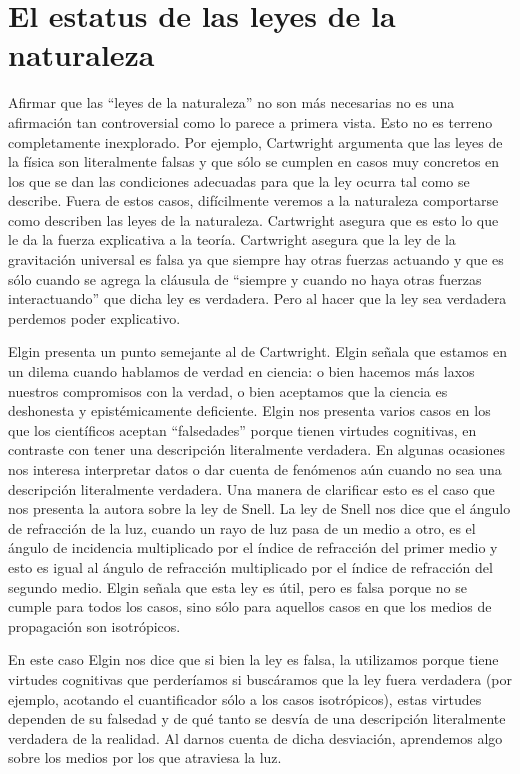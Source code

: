 \section{El estatus de las leyes de la naturaleza}

\noindent Afirmar que las ``leyes de la naturaleza'' no son más necesarias no es una afirmación tan controversial como lo parece a primera vista. Esto no es terreno completamente inexplorado. Por ejemplo, Cartwright \citeyear{Cartwright1983} argumenta que las leyes de la física son literalmente falsas y que sólo se cumplen en casos muy concretos en los que se dan las condiciones adecuadas para que la ley ocurra tal como se describe. Fuera de estos casos, difícilmente veremos a la naturaleza comportarse como describen las leyes de la naturaleza. Cartwright asegura que es esto lo que le da la fuerza explicativa a la teoría. Cartwright asegura que la ley de la gravitación universal es falsa ya que siempre hay otras fuerzas actuando y que es sólo cuando se agrega la cláusula de ``siempre y cuando no haya otras fuerzas interactuando'' que dicha ley es verdadera. Pero al hacer que la ley sea verdadera perdemos poder explicativo.

Elgin presenta un punto semejante al de Cartwright. Elgin \citeyear{Elgin2004} señala que estamos en un dilema cuando hablamos de verdad en ciencia: o bien hacemos más laxos nuestros compromisos con la verdad, o bien aceptamos que la ciencia es deshonesta y epistémicamente deficiente. Elgin nos presenta varios casos en los que los científicos aceptan ``falsedades'' porque tienen virtudes cognitivas, en contraste con tener una descripción literalmente verdadera. En algunas ocasiones nos interesa interpretar datos o dar cuenta de fenómenos aún cuando no sea una descripción literalmente verdadera. Una manera de clarificar esto es el caso que nos presenta la autora sobre la ley de Snell. La ley de Snell nos dice que el ángulo de refracción de la luz, cuando un rayo de luz pasa de un medio a otro, es el ángulo de incidencia multiplicado por el índice de refracción del primer medio y esto es igual al ángulo de refracción multiplicado por el índice de refracción del segundo medio. Elgin señala que esta ley es útil, pero es falsa porque no se cumple para todos los casos, sino sólo para aquellos casos en que los medios de propagación son isotrópicos.

En este caso Elgin nos dice que si bien la ley es falsa, la utilizamos porque tiene virtudes cognitivas que perderíamos si buscáramos que la ley fuera verdadera (por ejemplo, acotando el cuantificador sólo a los casos isotrópicos), estas virtudes dependen de su falsedad y de qué tanto se desvía de una descripción literalmente verdadera de la realidad. Al darnos cuenta de dicha desviación, aprendemos algo sobre los medios por los que atraviesa la luz.

